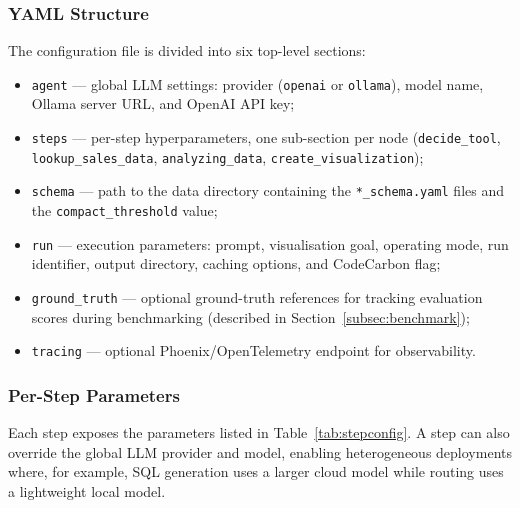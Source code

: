\documentclass[11pt,a4paper]{article}
\begin{document}
\subsubsection{YAML Structure}

The configuration file is divided into six top-level sections:

\begin{itemize}
    \item \texttt{agent} — global LLM settings: provider (\texttt{openai} or
          \texttt{ollama}), model name, Ollama server URL, and OpenAI API key;
    \item \texttt{steps} — per-step hyperparameters, one sub-section per node
          (\texttt{decide\_tool}, \texttt{lookup\_sales\_data}, \texttt{analyzing\_data},
          \texttt{create\_visualization});
    \item \texttt{schema} — path to the data directory containing the
          \texttt{*\_schema.yaml} files and the \texttt{compact\_threshold} value;
    \item \texttt{run} — execution parameters: prompt, visualisation goal, operating
          mode, run identifier, output directory, caching options, and CodeCarbon flag;
    \item \texttt{ground\_truth} — optional ground-truth references for tracking
          evaluation scores during benchmarking (described in
          Section~\ref{subsec:benchmark});
    \item \texttt{tracing} — optional Phoenix/OpenTelemetry endpoint for observability.
\end{itemize}

\subsubsection{Per-Step Parameters}

Each step exposes the parameters listed in Table~\ref{tab:stepconfig}. A step can
also override the global LLM provider and model, enabling heterogeneous deployments
where, for example, SQL generation uses a larger cloud model while routing uses a
lightweight local model.
\end{document}
